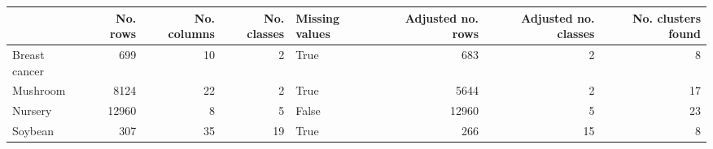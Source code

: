 \begin{tabular}{lrrrlrrr}
\toprule
{} &  No. rows &  No. columns &  No. classes &  Missing values &  Adjusted no. rows &  Adjusted no. classes &  No. clusters found \\
\midrule
Breast cancer &       699 &           10 &            2 &            True &                683 &                     2 &                   8 \\
Mushroom      &      8124 &           22 &            2 &            True &               5644 &                     2 &                  17 \\
Nursery       &     12960 &            8 &            5 &           False &              12960 &                     5 &                  23 \\
Soybean       &       307 &           35 &           19 &            True &                266 &                    15 &                   8 \\
\bottomrule
\end{tabular}
